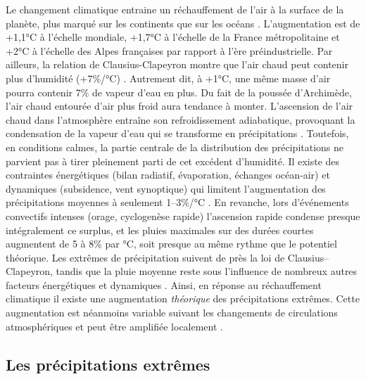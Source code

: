 \documentclass[
  article,
  nofooter,
  noheadings]{jss}
\begin{document}
Le changement climatique entraine un réchauffement de l'air à la surface
de la planète, plus marqué sur les continents que sur les océans
\citep{IPCC2021}. L'augmentation est de +1,1°C à l'échelle mondiale,
+1,7°C à l'échelle de la France métropolitaine et +2°C à l'échelle des
Alpes françaises par rapport à l'ère préindustrielle. Par ailleurs, la
relation de Clausius-Clapeyron montre que l'air chaud peut contenir plus
d'humidité (+7\%/°C) \citep{clapeyron1834}. Autrement dit, à +1°C, une
même masse d'air pourra contenir 7\% de vapeur d'eau en plus. Du fait de
la poussée d'Archimède, l'air chaud entourée d'air plus froid aura
tendance à monter. L'ascension de l'air chaud dans l'atmosphère entraîne
son refroidissement adiabatique, provoquant la condensation de la vapeur
d'eau qui se transforme en précipitations \citep{meteofrance}.
Toutefois, en conditions calmes, la partie centrale de la distribution
des précipitations ne parvient pas à tirer pleinement parti de cet
excédent d'humidité. Il existe des contraintes énergétiques (bilan
radiatif, évaporation, échanges océan‑air) et dynamiques (subsidence,
vent synoptique) qui limitent l'augmentation des précipitations moyennes
à seulement 1--3\%/°C \citep{IPCC2021}. En revanche, lors d'événements
convectifs intenses (orage, cyclogenèse rapide) l'ascension rapide
condense presque intégralement ce surplus, et les pluies maximales sur
des durées courtes augmentent de 5 à 8\% par °C, soit presque au même
rythme que le potentiel théorique. Les extrêmes de précipitation suivent
de près la loi de Clausius--Clapeyron, tandis que la pluie moyenne reste
sous l'influence de nombreux autres facteurs énergétiques et dynamiques
\citep{ogorman2015contrasting}. Ainsi, en réponse au réchauffement
climatique il existe une augmentation \emph{théorique} des
précipitations extrêmes. Cette augmentation est néanmoins variable
suivant les changements de circulations atmosphériques et peut être
amplifiée localement \citep{blanchet2021explaining}.

\subsection{Les précipitations
extrêmes}\label{les-pruxe9cipitations-extruxeames}
\end{document}

